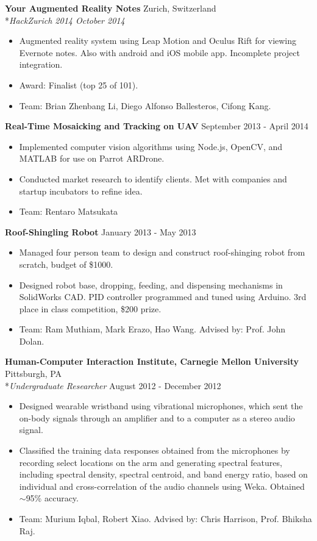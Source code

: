\documentclass{res}
\begin{document}
	
{\bf Your Augmented Reality Notes} \hfill Zurich, Switzerland
\\*\emph{HackZurich 2014 \hfill October 2014}
	\begin{itemize}
		\item Augmented reality system using Leap Motion and Oculus Rift for viewing Evernote notes. Also with android and iOS mobile app. Incomplete project integration.
		\item Award: Finalist (top 25 of 101). %
		\item Team: Brian Zhenbang Li, Diego Alfonso Ballesteros, Cifong Kang.
	\end{itemize}

    {\bf Real-Time Mosaicking and Tracking on UAV}  \hfill September 2013 - April 2014
\begin{itemize}
    \item Implemented computer vision algorithms using Node.js, OpenCV, and MATLAB for use on Parrot ARDrone.
    \item Conducted market research to identify clients. Met with companies and startup incubators to refine idea. 
	\item Team: Rentaro Matsukata
\end{itemize} 

    {\bf Roof-Shingling Robot}  \hfill January 2013 - May 2013
\begin{itemize}
    \item Managed four person team to design and construct roof-shinging robot from scratch, budget of \$1000. 
    \item Designed robot base, dropping, feeding, and dispensing mechanisms in SolidWorks CAD. PID controller programmed and tuned using Arduino. 3rd place in class competition, \$200 prize.
	\item Team: Ram Muthiam, Mark Erazo, Hao Wang. Advised by: Prof. John Dolan.
\end{itemize}

 {\bf Human-Computer Interaction Institute, Carnegie Mellon University} \hfill Pittsburgh, PA
    \\*\emph{Undergraduate Researcher} \hfill August 2012 - December 2012
\begin{itemize}
    \item Designed wearable wristband using vibrational microphones, which sent the on-body signals through an amplifier and to a computer as a stereo audio signal.
    \item Classified the training data responses obtained from the microphones by recording select locations on the arm and generating spectral features, including spectral density, spectral centroid, and band energy ratio, based on individual and cross-correlation of the audio channels using Weka. Obtained $\sim$95\% accuracy.
	\item Team: Murium Iqbal, Robert Xiao. Advised by: Chris Harrison, Prof. Bhiksha Raj.
\end{itemize}
\end{document}
